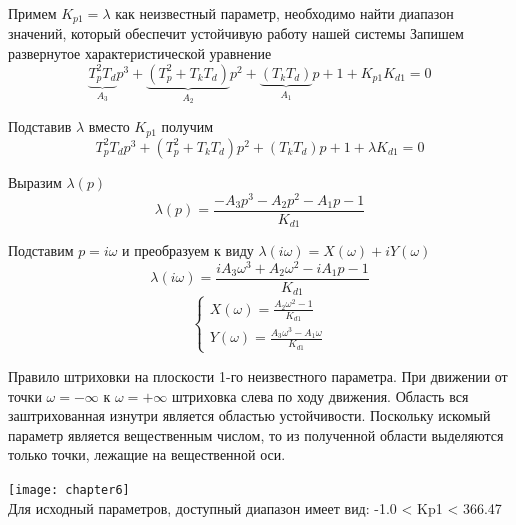 \documentclass[12pt, a4paper]{report}
\begin{document}
Примем $ K_{p1} = \lambda$ как неизвестный параметр, необходимо найти диапазон значений, который обеспечит устойчивую работу нашей системы
Запишем развернутое характеристической уравнение
$$\underbrace{T_{p}^2T_{d}}_{A_{3}}p^{3} + \underbrace{(T_{p}^{2} + T_{k}T_{d})}_{A_{2}}p^{2} + \underbrace{(T_{k}T_{d})}_{A_{1}}p + 1 + K_{p1}K_{d1} = 0 $$

Подставив $ \lambda $ вместо $ K_{p1} $ получим
$$ T_{p}^2T_{d}p^{3} + (T_{p}^{2} + T_{k}T_{d})p^{2} + (T_{k}T_{d})p + 1 + \lambda K_{d1} = 0 $$

Выразим $ \lambda(p) $
$$ \lambda(p) = \frac{- A_{3}p^{3} - A_{2}p^{2} - A_{1}p - 1}{K_{d1}} $$

Подставим $ p = i\omega $ и преобразуем к виду $ \lambda(i\omega) = X(\omega) + iY(\omega) $
$$ \lambda(i\omega) = \frac{iA_{3}\omega^{3} + A_{2}\omega^{2} - iA_{1}p - 1}{K_{d1}} $$
$$ \begin{cases}
        X(\omega) = \frac{A_{2}\omega^{2} - 1}{K_{d1}} \\
        Y(\omega) = \frac{A_{3}\omega^{3} - A_{1}\omega}{K_{d1}}
        \end{cases}
$$

Правило штриховки на плоскости 1-го неизвестного параметра. При движении от точки $ \omega = -\infty $ к $ \omega = +\infty $
штриховка слева по ходу движения. Область вся заштрихованная изнутри является областью устойчивости.
Поскольку искомый параметр является вещественным числом, то из полученной области выделяются только точки, лежащие на вещественной оси.

\texttt{[image: chapter6]}\\
Для исходный параметров, доступный диапазон имеет вид: -1.0 < Kp1 < 366.47
\end{document}
